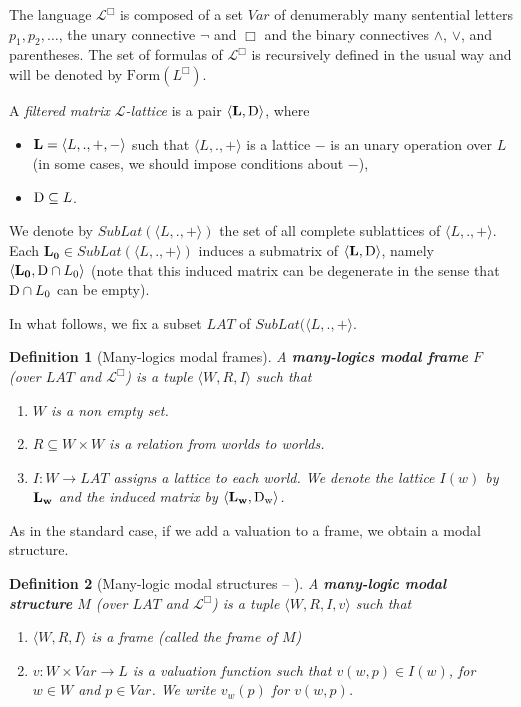 \documentclass{amsart}
\newtheorem{definition}{Definition}[section]
\newcommand{\Lg}{\mathcal{L}}
\newcommand{\pair}[1]{\langle #1 \rangle}
\newcommand{\For}{\mathrm{Form}}
\begin{document}
The language $\Lg^\Box$ is composed of a set $Var$ of denumerably many sentential letters $p_1, p_2, \dots$, the unary
connective  $\neg$ and $\Box$ and the binary connectives $\land$, $\lor$, 
and parentheses. The set of formulas of $\Lg^\Box$ is recursively defined in the usual way and will be denoted by $\For(L^\Box)$.

A {\it  filtered matrix $\Lg$-lattice} is a pair $\pair{{\bf L},{\rm D}}$, where 
\begin{itemize}
\item 
$ {\bf L}=\pair{L,.,+,-}$ such that  $\pair{{L},.,+}$ is a lattice 
$-$ is an unary operation over $L$ 
(in some cases, we should impose conditions about $-$),
\item ${\rm D} \subseteq L$. 
\end{itemize}
We denote by $SubLat(\pair{{L},.,+})$ the set of all complete sublattices of $\pair{{L},.,+}$. Each $\mathbf{L_0}\in SubLat(\pair{{L},.,+})$ induces a submatrix of $\pair{{\bf L},{\rm D}}$, namely $\pair{{\bf L_0},{\rm D}\cap L_0}$ (note that this induced matrix can be degenerate in the sense that ${\rm D}\cap L_0$ can be empty). 

In what follows, we fix a subset $LAT$ of $SubLat(\pair{{L},.,+}$.

\begin{definition}[Many-logics modal  frames] 
		 A \textbf{many-logics modal  frame} $F$ (over $LAT$ and $\Lg^\Box$) is a tuple $\pair{W, R, I}$ such that
	\begin{enumerate} 
 \item $W$ is a non empty set.
 \item $R \subseteq W \times W$ is a relation from worlds to worlds.
\item $I:W\to LAT$ assigns a lattice to each world. We denote the lattice $I(w)$  by ${\bf L_w}$ and the induced matrix by $\pair{{\bf L_w},{\rm D_w}}$. 
\end{enumerate}
    \end{definition}
    
As in the standard case, if we add a valuation to a frame, we obtain a modal structure.


\begin{definition}[Many-logic modal  structures -- \cite{freire_modality_2024}] 
		 A \textbf{many-logic modal  structure} $M$ (over $LAT$ and $\Lg^\Box$) is a tuple $\pair{W, R, I,v}$ such that
	\begin{enumerate} 
 \item $\pair{W, R, I}$ is a frame (called the frame of $M$)
\item   $v: W \times Var \longrightarrow L$ is a valuation function such that $v(w,p)\in I(w)$, for $w\in W$ and $p\in Var$. We write $v_w(p)$ for $v(w,p)$.
	\end{enumerate}
	\end{definition}	
\end{document}
